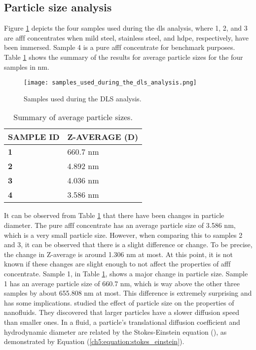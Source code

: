 \subsection{Particle size analysis}
\label{ch5:anchor:section:size_analysis}

Figure \ref{ch5:figure:samples} depicts the four samples used during the \acrshort{dls} analysis, where 1, 2, and 3 are \acrshort{afff} concentrates when mild steel, stainless steel, and \acrshort{hdpe}, respectively, have been immersed. Sample 4 is a pure \acrshort{afff} concentrate for benchmark purposes. Table \ref{ch5:table:sizes} shows the summary of the results for average particle sizes for the four samples in nm.
  
\begin{figure}[H]
    \centering
    \texttt{[image: samples\_used\_during\_the\_dls\_analysis.png]}
    \caption{Samples used during the DLS analysis.}
    \label{ch5:figure:samples}
\end{figure}

\begin{table}[H]
\renewcommand{\arraystretch}{2}

\caption{Summary of average particle sizes.}

\begin{tabularx}{\textwidth}{ XX }
\hline
\textbf{SAMPLE ID} & \textbf{Z-AVERAGE (D)} \\
\hline
\textbf{1} & 660.7 nm \\
\textbf{2} & 4.892 nm \\
\textbf{3} & 4.036 nm \\
\textbf{4} & 3.586 nm \\
\hline
\end{tabularx}

\label{ch5:table:sizes}
\end{table}

It can be observed from Table \ref{ch5:table:sizes} that there have been changes in particle diameter. The pure \acrshort{afff} concentrate has an average particle size of 3.586 nm, which is a very small particle size. However, when comparing this to samples 2 and 3, it can be observed that there is a slight difference or change. To be precise, the change in Z-average is around 1.306 nm at most. At this point, it is not known if these changes are slight enough to not affect the properties of \acrshort{afff} concentrate. Sample 1, in Table \ref{ch5:table:sizes}, shows a major change in particle size. Sample 1 has an average particle size of 660.7 nm, which is way above the other three samples by about 655.808 nm at most. This difference is extremely surprising and has some implications. \cite{koca2018effect} studied the effect of particle size on the properties of nanofluids. They discovered that larger particles have a slower diffusion speed than smaller ones. In a fluid, a particle's translational diffusion coefficient and hydrodynamic diameter are related by the Stokes-Einstein equation (\cite{an2018effect}), as demonstrated by Equation (\ref{ch5:equation:stokes_einstein}).

